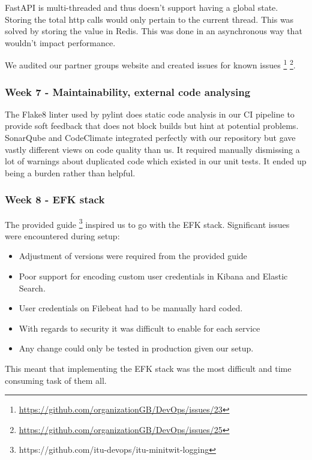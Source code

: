 \documentclass{article}
\begin{document}
FastAPI is multi-threaded and thus doesn't support having a global state. Storing the total http calls would only pertain to the current thread. This was solved by storing the value in Redis. This was done in an asynchronous way that wouldn't impact performance. 

We audited our partner groups website and created issues for known issues \footnote{\url{https://github.com/organizationGB/DevOps/issues/23}} \footnote{\url{https://github.com/organizationGB/DevOps/issues/25}}. 

\subsubsection{Week 7 - Maintainability, external code analysing }

The Flake8 linter used by pylint does static code analysis in our CI pipeline to provide soft feedback that does not block builds but hint at potential problems. SonarQube and CodeClimate integrated perfectly with our repository but gave vastly different views on code quality than us. It required manually dismissing a lot of warnings about duplicated code which existed in our unit tests. It ended up being a burden rather than helpful.

\subsubsection{Week 8 - EFK stack}

The provided guide \footnote{https://github.com/itu-devops/itu-minitwit-logging} inspired us to go with the EFK stack. Significant issues were encountered during setup:

\begin{itemize}
    \item Adjustment of versions were required from the provided guide 
    \item Poor support for encoding custom user credentials in Kibana and Elastic Search.
    \item User credentials on Filebeat had to be manually hard coded.
    \item With regards to security it was difficult to enable for each service 
    \item Any change could only be tested in production given our setup.
\end{itemize}

This meant that implementing the EFK stack was the most difficult and time consuming task of them all. 
\end{document}
